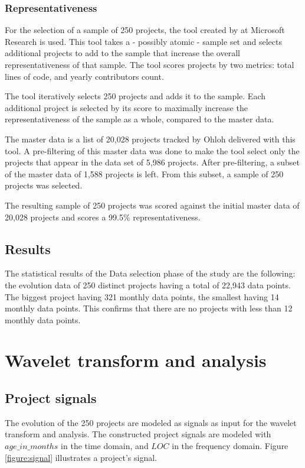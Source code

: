 \subsubsection{Representativeness}
For the selection of a sample of 250 projects, the tool created by
\citet{nagappan} at Microsoft Research is used. This tool takes a - possibly
atomic - sample set and selects additional projects to add to the sample that
increase the overall representativeness of that sample. The tool scores
projects by two metrics: total lines of code, and yearly contributors count.

The tool iteratively selects 250 projects and adds it to the sample. Each
additional project is selected by its score to maximally increase the
representativeness of the sample as a whole, compared to the master data.

The master data is a list of 20,028 projects tracked by Ohloh delivered with
this tool. A pre-filtering of this master data was done to make the tool select
only the projects that appear in the data set of 5,986 projects. After
pre-filtering, a subset of the master data of 1,588 projects is left. From this
subset, a sample of 250 projects was selected.

The resulting sample of 250 projects was scored against the initial master data
of 20,028 projects and scores a 99.5\% representativeness.

\subsection{Results}
The statistical results of the Data selection phase of the study are the
following: the evolution data of 250 distinct projects having a total of 22,943
data points. The biggest project having 321 monthly data points, the smallest
having 14 monthly data points. This confirms that there are no projects with
less than 12 monthly data points.

\section{Wavelet transform and analysis}
\subsection{Project signals}
The evolution of the 250 projects are modeled as signals as input for the
wavelet transform and analysis. The constructed project signals are modeled with
$age\_in\_months$ in the time domain, and $LOC$ in the frequency domain. Figure
\ref{figure:signal} illustrates a project's signal.

